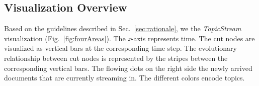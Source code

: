 \subsection{Visualization Overview}

Based on the guidelines described in Sec.~\ref{sec:rationale}, we  the \emph{\normalsize TopicStream} visualization (Fig.~\ref{fig:fourAreas}).
The \emph{\normalsize x}-axis represents time.
The cut nodes are visualized as vertical bars at the corresponding time step.
The evolutionary relationship between cut nodes is represented by the stripes between the corresponding vertical bars.
The flowing dots on the right side  the newly arrived documents that are currently streaming in.
The different colors encode  topics.

